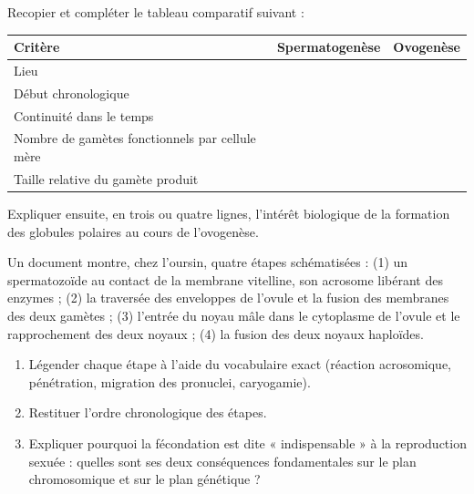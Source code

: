 \documentclass[11pt]{article}
\newcounter{popsec}
\newcounter{popsub}
\newcommand{\courssub}[1]{%
  \stepcounter{popsub}%
  \par\vspace{9pt}\noindent{\popxbold\fontsize{11.5}{13}\selectfont\color{popink}{\color{poporange}\thepopsec.\thepopsub}\hspace{6pt}#1}\par\nopagebreak\vspace{4pt}
}
\begin{document}
\begin{exercice}
Recopier et compléter le tableau comparatif suivant :
\begin{center}
\begin{tabularx}{\linewidth}{|l|X|X|}
\hline
\rowcolor{popblueL} \textbf{Critère} & \textbf{Spermatogenèse} & \textbf{Ovogenèse} \\
\hline
Lieu & & \\
\hline
Début chronologique & & \\
\hline
Continuité dans le temps & & \\
\hline
Nombre de gamètes fonctionnels par cellule mère & & \\
\hline
Taille relative du gamète produit & & \\
\hline
\end{tabularx}
\end{center}
Expliquer ensuite, en trois ou quatre lignes, l'intérêt biologique de la formation des globules polaires au cours de l'ovogenèse.
\end{exercice}

\begin{exercice}
Un document montre, chez l'oursin, quatre étapes schématisées : (1) un spermatozoïde au contact de la membrane vitelline, son acrosome libérant des enzymes ; (2) la traversée des enveloppes de l'ovule et la fusion des membranes des deux gamètes ; (3) l'entrée du noyau mâle dans le cytoplasme de l'ovule et le rapprochement des deux noyaux ; (4) la fusion des deux noyaux haploïdes.
\begin{enumerate}
\item Légender chaque étape à l'aide du vocabulaire exact (réaction acrosomique, pénétration, migration des pronuclei, caryogamie).
\item Restituer l'ordre chronologique des étapes.
\item Expliquer pourquoi la fécondation est dite « indispensable » à la reproduction sexuée : quelles sont ses deux conséquences fondamentales sur le plan chromosomique et sur le plan génétique ?
\end{enumerate}
\end{exercice}

\courssub{Je me prépare au Bac}
\end{document}
